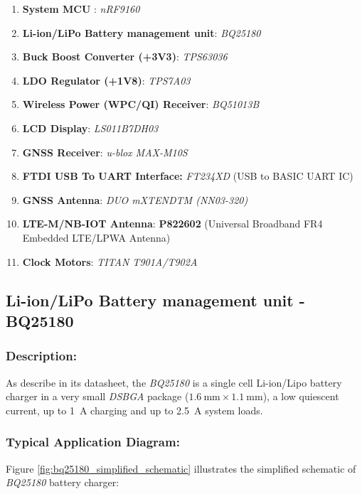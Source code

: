 \documentclass[report.tex]{subfiles}
\begin{document}
\begin{enumerate}
\item \textbf{System MCU} : \textit{nRF9160}
\item \textbf{Li-ion/LiPo Battery management unit}: \textit{BQ25180}
\item \textbf{Buck Boost Converter (+3V3)}: \textit{TPS63036}
\item \textbf{LDO Regulator (+1V8)}: \textit{TPS7A03}
\item \textbf{Wireless Power (WPC/QI) Receiver}: \textit{BQ51013B}
\item \textbf{LCD Display}: \textit{LS011B7DH03}
\item \textbf{GNSS Receiver}: \textit{u-blox MAX-M10S}
\item \textbf{FTDI USB To UART Interface:} \textit{FT234XD} (USB to BASIC UART IC)
\item \textbf{GNSS Antenna}: \textit{DUO mXTENDTM (NN03-320)}
\item \textbf{LTE-M/NB-IOT Antenna}: \textbf{P822602} (Universal Broadband FR4 Embedded LTE/LPWA Antenna)
\item \textbf{Clock Motors}: \textit{TITAN T901A/T902A}
\end{enumerate}

\subsection{Li-ion/LiPo Battery management unit - BQ25180}
\subsubsection{Description:}
As describe in its datasheet, the \textit{BQ25180}\cite{bq25180DS} is a single cell Li-ion/Lipo battery charger in a very small \textit{DSBGA} package ($\SI{1.6}{\milli\meter}\times\SI{1.1}{\milli\meter}$), a low quiescent current, up to \SI{1}{\ampere} charging and up to \SI{2.5}{\ampere} system loads.

\subsubsection{Typical Application Diagram:}

Figure \ref{fig:bq25180_simplified_schematic} illustrates the simplified schematic of  \textit{BQ25180} battery charger:
\end{document}
